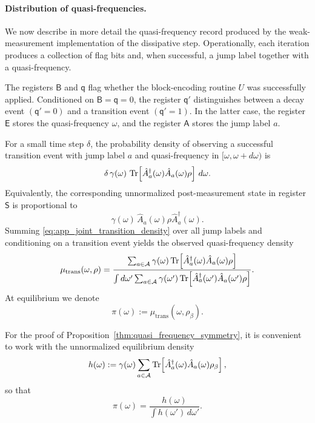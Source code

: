 \documentclass[showpacs,amsmath,amssymb,twocolumn,prx,superscriptaddress,10pt,aps,nofootinbib]{revtex4-2}
\newcommand{\rS}{\boldsymbol{\mathsf{S}}}
\newcommand{\rE}{\boldsymbol{\mathsf{E}}}
\newcommand{\rA}{\boldsymbol{\mathsf{A}}}
\newcommand{\rB}{\boldsymbol{\mathsf{B}}}
\newcommand{\rqq}{\boldsymbol{\mathsf{q}}}
\begin{document}
\paragraph{Distribution of quasi-frequencies.}
\label{app:distribution_quasi_frequencies}

We now describe in more detail the quasi-frequency record produced by the weak-measurement implementation of the dissipative step. Operationally, each iteration produces a collection of flag bits and, when successful, a jump label together with a quasi-frequency.

The registers \(\rB\) and \(\rqq\) flag whether the block-encoding routine \(U\) was successfully applied. Conditioned on \(\rB=\rqq=0\), the register \(\rqq'\) distinguishes between a decay event \((\rqq'=0)\) and a transition event \((\rqq'=1)\). In the latter case, the register \(\rE\) stores the quasi-frequency \(\omega\), and the register \(\rA\) stores the jump label \(a\).

For a small time step \(\delta\), the probability density of observing a successful transition event with jump label \(a\) and quasi-frequency in \([\omega,\omega+d\omega)\) is
\begin{equation}
\label{eq:app_joint_transition_density}
    \delta\,\gamma(\omega)\,
    \Tr\!\left[\hat A_a^\dagger(\omega)\hat A_a(\omega)\rho\right]\,d\omega.
\end{equation}
Equivalently, the corresponding unnormalized post-measurement state in register \(\rS\) is proportional to
\begin{equation}
    \gamma(\omega)\,\hat A_a(\omega)\rho \hat A_a^\dagger(\omega).
\end{equation}
Summing \eqref{eq:app_joint_transition_density} over all jump labels and conditioning on a transition event yields the observed quasi-frequency density
\begin{equation}
\label{eq:app_mu_trans}
\mu_{\mathrm{trans}}(\omega,\rho)
=
\frac{
\sum_{a\in\mathcal A}
\gamma(\omega)\Tr\!\left[\hat A_a^\dagger(\omega)\hat A_a(\omega)\rho\right]
}{
\int d\omega'
\sum_{a\in\mathcal A}
\gamma(\omega')\Tr\!\left[\hat A_a^\dagger(\omega')\hat A_a(\omega')\rho\right]
}.
\end{equation}
At equilibrium we denote
\begin{equation}
    \pi(\omega):=\mu_{\mathrm{trans}}(\omega,\rho_\beta).
\end{equation}

For the proof of Proposition~\ref{thm:quasi_frequency_symmetry}, it is convenient to work with the unnormalized equilibrium density
\begin{equation}
\label{eq:app_h_definition}
    h(\omega):=
    \gamma(\omega)\sum_{a\in\mathcal A}
    \Tr\!\left[\hat A_a^\dagger(\omega)\hat A_a(\omega)\rho_\beta\right],
\end{equation}
so that
\begin{equation}
    \pi(\omega)=\frac{h(\omega)}{\int h(\omega')\,d\omega'}.
\end{equation}
\end{document}
